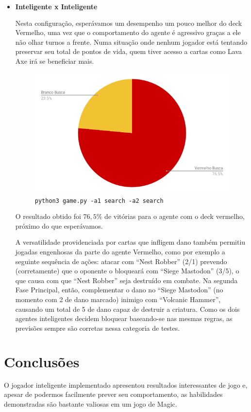 \begin{itemize}
\item \textbf{Inteligente x Inteligente}

Nesta configuração, esperávamos um desempenho um pouco melhor do deck Vermelho, uma vez que o comportamento do agente é agressivo graças a ele não olhar turnos a frente. Numa situação onde nenhum jogador está tentando preservar seu total de pontos de vida, quem tiver acesso a cartas como Lava Axe irá se beneficiar mais.

\begin{figure}[!h]
  \centering
  \includegraphics[scale=0.4]{picstcc/sese.png}
  \caption{\texttt{python3 game.py -a1 search -a2 search}}
  \label{sese}
\end{figure}

O resultado obtido foi $76,5\%$ de vitórias para o agente com o deck vermelho, próximo do que esperávamos.

A versatilidade providenciada por cartas que infligem dano também permitiu jogadas engenhosas da parte do agente Vermelho, como por exemplo a seguinte sequência de ações: atacar com ``Nest Robber'' (2/1) prevendo (corretamente) que o oponente o bloqueará com ``Siege Mastodon'' (3/5), o que causa com que ``Nest Robber'' seja destruído em combate. Na segunda Fase Principal, então, complementar o dano no ``Siege Mastodon'' (no momento com 2 de dano marcado) inimigo com ``Volcanic Hammer'', causando um total de 5 de dano capaz de destruir a criatura. Como os dois agentes inteligentes decidem bloquear baseando-se nas mesmas regras, as previsões sempre são corretas nessa categoria de testes.

\end{itemize}

\section{Conclusões}
O jogador inteligente implementado apresentou resultados interessantes de jogo e, apesar de podermos facilmente prever seu comportamento, as habilidades demonstradas são bastante valiosas em um jogo de Magic.

